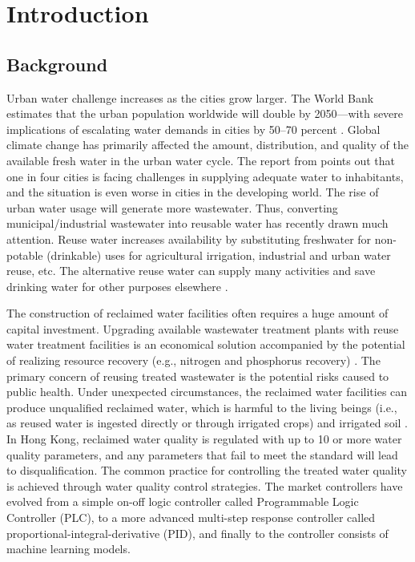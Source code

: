 \chapter{Introduction}
\section{Background}
Urban water challenge increases as the cities grow larger. The World Bank estimates that the urban population worldwide will double by 2050---with severe implications of escalating water demands in cities by 50--70 percent \citep{theworldbankCircularEconomyOpportunity2021}. Global climate change has primarily affected the amount, distribution, and quality of the available fresh water in the urban water cycle. The report from \citep{unicefURBANWATERSCARCITY2021} points out that one in four cities is facing challenges in supplying adequate water to inhabitants, and the situation is even worse in cities in the developing world. The rise of urban water usage will generate more wastewater. Thus, converting municipal/industrial wastewater into reusable water has recently drawn much attention. Reuse water increases availability by substituting freshwater for non-potable (drinkable) uses for agricultural irrigation, industrial and urban water reuse, etc. The alternative reuse water can supply many activities and save drinking water for other purposes elsewhere \citep{adewumiTreatedWastewaterReuse2010}.

%
The construction of reclaimed water facilities often requires a huge amount of capital investment. Upgrading available wastewater treatment plants with reuse water treatment facilities is an economical solution accompanied by the potential of realizing resource recovery (e.g., nitrogen and phosphorus recovery) \citep{maryamWastewaterReclamationReuse2019,kehreinCriticalReviewResource2020}. The primary concern of reusing treated wastewater is the potential risks caused to public health. Under unexpected circumstances, the reclaimed water facilities can produce unqualified reclaimed water, which is harmful to the living beings (i.e., as reused water is ingested directly or through irrigated crops) and irrigated soil \citep{adewumiTreatedWastewaterReuse2010}. In Hong Kong, reclaimed water quality is regulated with up to 10 or more water quality parameters, and any parameters that fail to meet the standard will lead to disqualification. The common practice for controlling the treated water quality is achieved through water quality control strategies. The market controllers have evolved from a simple on-off logic controller called Programmable Logic Controller (PLC), to a more advanced multi-step response controller called proportional-integral-derivative (PID), and finally to the controller consists of machine learning models.

